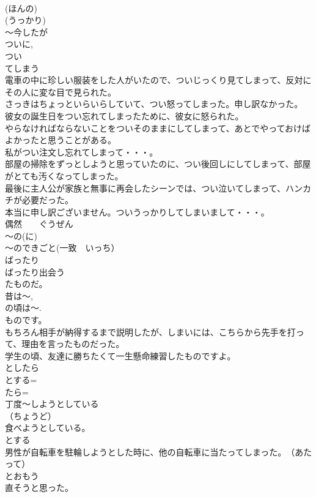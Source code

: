 \documentclass[8pt]{extreport}
\begin{document}
\begin{CJK}{UTF8}{min}
\\	(ほんの) 
\\	(うっかり) 
\\	～今したが　
\\	ついに, 
\\	つい
\\	てしまう
\\	電車の中に珍しい服装をした人がいたので、ついじっくり見てしまって、反対にその人に変な目で見られた。
\\	さっきはちょっといらいらしていて、つい怒ってしまった。申し訳なかった。
\\	彼女の誕生日をつい忘れてしまったために、彼女に怒られた。
\\	やらなければならないことをついそのままにしてしまって、あとでやっておけばよかったと思うことがある。
\\	私がつい注文し忘れてしまって・・・。
\\	部屋の掃除をずっとしようと思っていたのに、つい後回しにしてしまって、部屋がとても汚くなってしまった。
\\	最後に主人公が家族と無事に再会したシーンでは、つい泣いてしまって、ハンカチが必要だった。
\\	本当に申し訳ございません。ついうっかりしてしまいまして・・・。
\\	偶然　　ぐうぜん
\\	～の(に)
\\	～のできごと(一致　いっち）　
\\	ばったり
\\	ばったり出会う	
\\	たものだ。
\\	昔は～, 
\\	の頃は～.
\\	ものです。
\\	もちろん相手が納得するまで説明したが、しまいには、こちらから先手を打って、理由を言ったものだった。
\\	学生の頃、友達に勝ちたくて一生懸命練習したものですよ。
\\	としたら
\\	とする=
\\	たら=
\\	丁度～しようとしている
\\	（ちょうど）
\\	食べようとしている。
\\	とする
\\	男性が自転車を駐輪しようとした時に、他の自転車に当たってしまった。　（あたって）　　
\\	とおもう
\\	直そうと思った。　

\end{CJK}
\end{document}
